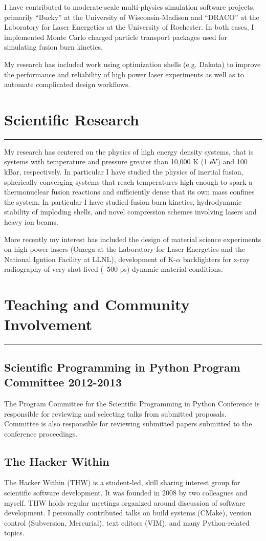 \documentclass[letterpaper,11pt]{article}
\newcommand{\sectionline}{\vspace{-0.05in}\hrule\vspace{0.05in}}
\begin{document}
I have contributed to moderate-scale multi-physics simulation software
projects, primarily ``Bucky'' at the University of Wisconsin-Madison and
``DRACO'' at the Laboratory for Laser Energetics at the University of Rochester.
In both cases, I implemented Monte Carlo charged particle transport packages
used for simulating fusion burn kinetics.

My research has included work using optimization shells (e.g. Dakota) to
improve the performance and reliability of high power laser experiments as well
as to automate complicated design workflows.


\section*{Scientific Research}
\sectionline
My research has centered on the physics of high energy density systems, that is
systems with temperature and pressure greater than 10,000 K (1 eV) and 100
kBar, respectively.  In particular I have studied the physics of inertial
fusion, spherically converging systems that reach temperatures high enough to
spark a thermonuclear fusion reactions and sufficiently dense that its own mass
confines the system.  In particular I have studied fusion burn kinetics,
hydrodynamic stability of imploding shells, and novel compression schemes
involving lasers and heavy ion beams.

More recently my interest has included the design of material science
experiments on high power lasers (Omega at the Laboratory for Laser Energetics
and the National Igntion Facility at LLNL), development of K-$\alpha$
backlighters for x-ray radiography of very shot-lived (~500 ps) dynamic
material conditions.

\section*{Teaching and Community Involvement}
\sectionline

\subsection*{Scientific Programming in Python Program Committee 2012-2013}
The Program Committee for the Scientific Programming in Python Conference is
responsible for reviewing and selecting talks from submitted proposals.
Committee is also responsible for reviewing submitted papers submitted to the
conference proceedings.

\subsection*{The Hacker Within}
The Hacker Within (THW) is a student-led, skill sharing interest group for
scientific software development.  It was founded in 2008 by two colleagues and
myself.  THW holds regular meetings organized around discussion of software
development.  I personally contributed talks on build systems (CMake), version
control (Subversion, Mercurial), text editors (VIM), and many Python-related
topics.
\end{document}

